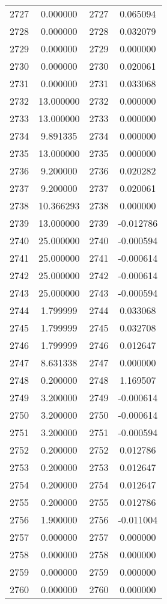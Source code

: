 \documentclass[12pt]{article}
\begin{document}
\begin{longtable}{@{}cccc@{}}
2727 & 0.000000 & 2727 & 0.065094 \\
2728 & 0.000000 & 2728 & 0.032079 \\
2729 & 0.000000 & 2729 & 0.000000 \\
2730 & 0.000000 & 2730 & 0.020061 \\
2731 & 0.000000 & 2731 & 0.033068 \\
2732 & 13.000000 & 2732 & 0.000000 \\
2733 & 13.000000 & 2733 & 0.000000 \\
2734 & 9.891335 & 2734 & 0.000000 \\
2735 & 13.000000 & 2735 & 0.000000 \\
2736 & 9.200000 & 2736 & 0.020282 \\
2737 & 9.200000 & 2737 & 0.020061 \\
2738 & 10.366293 & 2738 & 0.000000 \\
2739 & 13.000000 & 2739 & -0.012786 \\
2740 & 25.000000 & 2740 & -0.000594 \\
2741 & 25.000000 & 2741 & -0.000614 \\
2742 & 25.000000 & 2742 & -0.000614 \\
2743 & 25.000000 & 2743 & -0.000594 \\
2744 & 1.799999 & 2744 & 0.033068 \\
2745 & 1.799999 & 2745 & 0.032708 \\
2746 & 1.799999 & 2746 & 0.012647 \\
2747 & 8.631338 & 2747 & 0.000000 \\
2748 & 0.200000 & 2748 & 1.169507 \\
2749 & 3.200000 & 2749 & -0.000614 \\
2750 & 3.200000 & 2750 & -0.000614 \\
2751 & 3.200000 & 2751 & -0.000594 \\
2752 & 0.200000 & 2752 & 0.012786 \\
2753 & 0.200000 & 2753 & 0.012647 \\
2754 & 0.200000 & 2754 & 0.012647 \\
2755 & 0.200000 & 2755 & 0.012786 \\
2756 & 1.900000 & 2756 & -0.011004 \\
2757 & 0.000000 & 2757 & 0.000000 \\
2758 & 0.000000 & 2758 & 0.000000 \\
2759 & 0.000000 & 2759 & 0.000000 \\
2760 & 0.000000 & 2760 & 0.000000 \\

\end{longtable}
\end{document}
